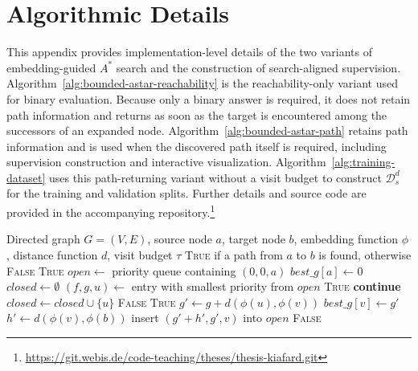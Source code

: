 \chapter{Algorithmic Details}
\label{app:algorithmic-details}

This appendix provides implementation-level details of the two variants of embedding-guided $A^*$ search and the construction of search-aligned supervision. Algorithm~\ref{alg:bounded-astar-reachability} is the reachability-only variant used for binary evaluation. Because only a binary answer is required, it does not retain path information and returns as soon as the target is encountered among the successors of an expanded node. Algorithm~\ref{alg:bounded-astar-path} retains path information and is used when the discovered path itself is required, including supervision construction and interactive visualization. Algorithm~\ref{alg:training-dataset} uses this path-returning variant without a visit budget to construct $\mathcal{D}_s^d$ for the training and validation splits. Further details and source code are provided in the accompanying repository.\footnote{\url{https://git.webis.de/code-teaching/theses/thesis-kiafard.git}}

\begin{algorithm}[H]
\caption{Bounded embedding-guided $A^*$ reachability search}
\label{alg:bounded-astar-reachability}
\begin{algorithmic}[1]
\Require Directed graph $G=(V,E)$, source node $a$, target node $b$, embedding function $\phi$, distance function $d$, visit budget $\tau$
\Ensure \textsc{True} if a path from $a$ to $b$ is found, otherwise \textsc{False}
    \State \Return \textsc{True}
\EndIf
\State $open \gets$ priority queue containing $(0,0,a)$
\State $best\_g[a] \gets 0$
\State $closed \gets \emptyset$
    \State $(f,g,u) \gets$ entry with smallest priority from $open$
        \State \Return \textsc{True}
    \EndIf
        \State \textbf{continue}
    \EndIf
    \State $closed \gets closed \cup \{u\}$
        \State \Return \textsc{False}
    \EndIf
        \State \Return \textsc{True}
    \EndIf
        \State $g' \gets g + d(\phi(u),\phi(v))$
            \State $best\_g[v] \gets g'$
            \State $h' \gets d(\phi(v),\phi(b))$
            \State insert $(g'+h',g',v)$ into $open$
        \EndIf
    \EndFor
\EndWhile
\State \Return \textsc{False}
\end{algorithmic}
\end{algorithm}

